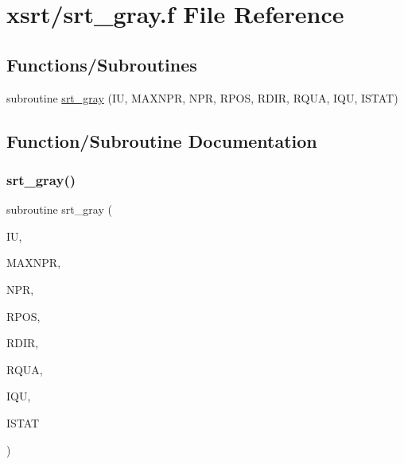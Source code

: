 \hypertarget{srt__gray_8f}{}\section{xsrt/srt\+\_\+gray.f File Reference}
\label{srt__gray_8f}
\subsection*{Functions/\+Subroutines}
\begin{DoxyCompactItemize}
\item 
subroutine \hyperlink{srt__gray_8f_a5f7470a3cc6421e973dd267bbcacd2a9}{srt\+\_\+gray} (IU, M\+A\+X\+N\+PR, N\+PR, R\+P\+OS, R\+D\+IR, R\+Q\+UA, I\+QU, I\+S\+T\+AT)
\end{DoxyCompactItemize}


\subsection{Function/\+Subroutine Documentation}
\mbox{\label{srt__gray_8f_a5f7470a3cc6421e973dd267bbcacd2a9}} 
\subsubsection{\texorpdfstring{srt\+\_\+gray()}{srt\_gray()}}
{\footnotesize\ttfamily subroutine srt\+\_\+gray (\begin{DoxyParamCaption}\item[{integer}]{IU,  }\item[{integer}]{M\+A\+X\+N\+PR,  }\item[{integer}]{N\+PR,  }\item[{double precision, dimension(3,maxnpr)}]{R\+P\+OS,  }\item[{double precision, dimension(3)}]{R\+D\+IR,  }\item[{double precision, dimension(3)}]{R\+Q\+UA,  }\item[{integer, dimension(maxnpr)}]{I\+QU,  }\item[{integer}]{I\+S\+T\+AT }\end{DoxyParamCaption})}

